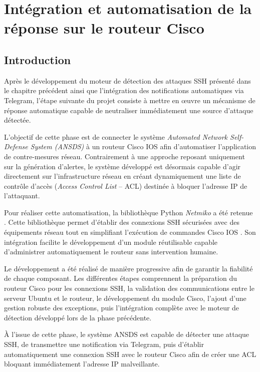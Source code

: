 \chapter{Intégration et automatisation de la réponse sur le routeur Cisco}

\section{Introduction}

Après le développement du moteur de détection des attaques SSH présenté dans le chapitre précédent ainsi que l'intégration des notifications automatiques via Telegram, l'étape suivante du projet consiste à mettre en œuvre un mécanisme de réponse automatique capable de neutraliser immédiatement une source d'attaque détectée.

L'objectif de cette phase est de connecter le système \textit{Automated Network Self-Defense System (ANSDS)} à un routeur Cisco IOS afin d'automatiser l'application de contre-mesures réseau. Contrairement à une approche reposant uniquement sur la génération d'alertes, le système développé est désormais capable d'agir directement sur l'infrastructure réseau en créant dynamiquement une liste de contrôle d'accès (\textit{Access Control List} -- ACL) destinée à bloquer l'adresse IP de l'attaquant.

Pour réaliser cette automatisation, la bibliothèque Python \textit{Netmiko} a été retenue \cite{netmiko_docs}. Cette bibliothèque permet d'établir des connexions SSH sécurisées avec des équipements réseau tout en simplifiant l'exécution de commandes Cisco IOS \cite{netmiko_docs}. Son intégration facilite le développement d'un module réutilisable capable d'administrer automatiquement le routeur sans intervention humaine.

Le développement a été réalisé de manière progressive afin de garantir la fiabilité de chaque composant. Les différentes étapes comprennent la préparation du routeur Cisco pour les connexions SSH, la validation des communications entre le serveur Ubuntu et le routeur, le développement du module Cisco, l'ajout d'une gestion robuste des exceptions, puis l'intégration complète avec le moteur de détection développé lors de la phase précédente.

À l'issue de cette phase, le système ANSDS est capable de détecter une attaque SSH, de transmettre une notification via Telegram, puis d'établir automatiquement une connexion SSH avec le routeur Cisco afin de créer une ACL bloquant immédiatement l'adresse IP malveillante.

